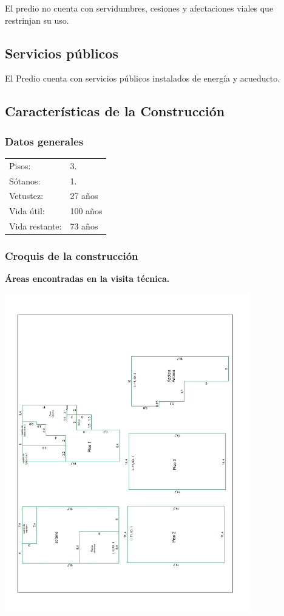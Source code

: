 \documentclass[12pt,a4paper,twoside]{article}
\begin{document}
El predio no cuenta con servidumbres, cesiones y afectaciones viales que restrinjan su uso.

\subsection{Servicios públicos}
	

	El Predio cuenta con servicios públicos instalados de energía y acueducto.
\subsection{Características de la Construcción}

\subsubsection{Datos generales}
%
\begin{tabular}{ l l }
%	
	Pisos: & 3.\\
	Sótanos: & 1.\\
	Vetustez: & 27 años \\
	Vida útil: & 100 años \\
	Vida restante: & 73 años \\
%	
\end{tabular}
%
\subsubsection{Croquis de la construcción}
%
\textbf{Áreas encontradas en la visita técnica.} \\
%
%
\begin{center}
	\includegraphics[width=0.8\textwidth]{Imagenes/PLANO}
\end{center}
%
\end{document}
